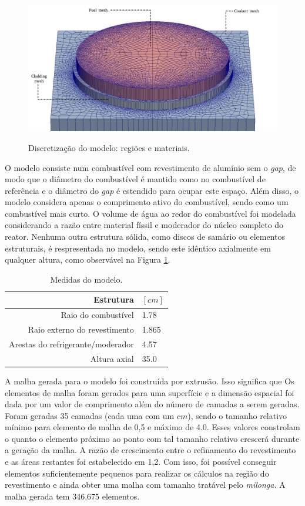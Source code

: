 \begin{figure}[htb]
  \caption{Discretização do modelo: regiões e materiais.}
  \centering\includegraphics[scale=0.5]{figuras/regioes_edges_com_legenda_ingles.png}
  \label{fig:modelo_exploded}
\end{figure}

O modelo consiste num combustível com revestimento de alumínio sem
o \textit{gap}, de modo que o diâmetro do combustível é mantido como no
combustível de referência e o diâmetro do \textit{gap} é estendido para
ocupar este espaço. Além disso, o modelo considera apenas o comprimento
ativo do combustível, sendo como um combustível mais curto. O volume
de água ao redor do combustível foi modelada considerando a razão entre
material físsil e moderador do núcleo completo do reator. Nenhuma outra
estrutura sólida, como discos de samário ou elementos estruturais, é
respresentada no modelo, sendo este idêntico axialmente em qualquer
altura, como observável na Figura \ref{fig:modelo_exploded}.

\begin{table}[htb]
\centering
  \caption[Medidas do modelo.]{Medidas do modelo.}
  \label{tab:size_model}
  \begin{tabular}{r l}
    Estrutura & $[cm]$ \\
    \hline
    Raio do combustível & 1.78 \\
    Raio externo do revestimento & 1.865 \\
    Arestas do refrigerante/moderador & 4.57 \\
    \hline
    Altura axial & 35.0 \\
    \hline
  \end{tabular}
\end{table}

A malha gerada para o modelo foi construída por extrusão. Isso significa que
Os elementos de malha foram gerados para uma superfície e a dimensão espacial
foi dada por um valor de comprimento além do número de camadas a serem geradas.
Foram geradas 35 camadas (cada uma com um $cm$), sendo o tamanho relativo
mínimo para elemento de malha de 0,5 e máximo de 4.0. Esses valores constrolam
o quanto o elemento próximo ao ponto com tal tamanho relativo crescerá durante
a geração da malha. A razão de crescimento entre o refinamento do revestimento
e as áreas restantes foi estabelecido em 1,2. Com isso, foi possível conseguir
elementos suficientemente pequenos para realizar os cálculos na região
do revestimento e ainda obter uma malha com tamanho tratável pelo \textit{milonga}.
A malha gerada tem 346.675 elementos.

